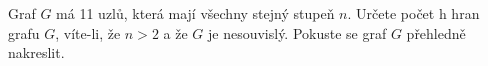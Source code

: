 \subsubsection{}
Graf $G$ má 11 uzlů, která mají všechny stejný stupeň $n$. Určete počet h hran
grafu $G$, víte-li, že $n>2$ a že $G$ je nesouvislý. Pokuste se graf $G$
přehledně nakreslit.
